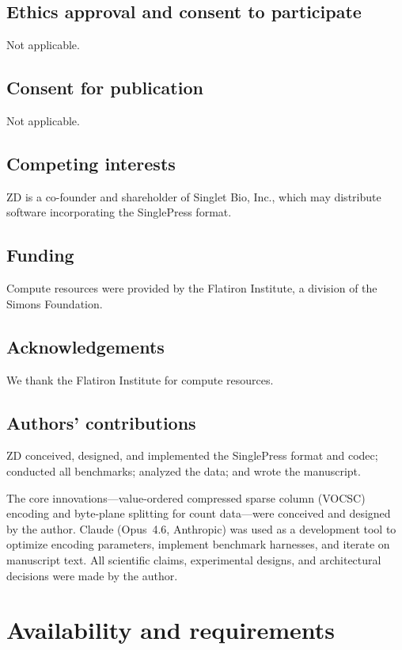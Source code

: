 \documentclass[10pt,twocolumn,letterpaper]{article}
\begin{document}
\subsection*{Ethics approval and consent to participate}
Not applicable.

\subsection*{Consent for publication}
Not applicable.

\subsection*{Competing interests}
ZD is a co-founder and shareholder of Singlet Bio, Inc., which may distribute software incorporating the SinglePress format.

\subsection*{Funding}
Compute resources were provided by the Flatiron Institute, a division of the Simons Foundation.

\subsection*{Acknowledgements}
We thank the Flatiron Institute for compute resources.

\subsection*{Authors' contributions}
ZD conceived, designed, and implemented the SinglePress format and codec; conducted all benchmarks; analyzed the data; and wrote the manuscript.

\begin{AIdisclosure}
The core innovations---value-ordered compressed sparse column (VOCSC) encoding and byte-plane splitting for count data---were conceived and designed by the author.
Claude (Opus~4.6, Anthropic) was used as a development tool to optimize encoding parameters, implement benchmark harnesses, and iterate on manuscript text.
All scientific claims, experimental designs, and architectural decisions were made by the author.
\end{AIdisclosure}


\section*{Availability and requirements}
\end{document}
